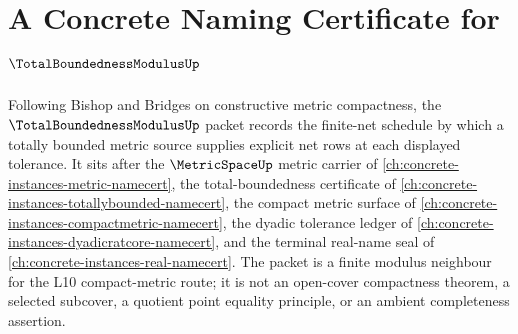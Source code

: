 \chapter{A Concrete Naming Certificate for $\TotalBoundednessModulusUp$}
\label{ch:concrete-instances-total-boundedness-modulus-namecert}

Following Bishop and Bridges on constructive metric compactness, the $\TotalBoundednessModulusUp$ packet records the finite-net schedule by which a totally bounded metric source supplies explicit net rows at each displayed tolerance. It sits after the $\MetricSpaceUp$ metric carrier of \autoref{ch:concrete-instances-metric-namecert}, the total-boundedness certificate of \autoref{ch:concrete-instances-totallybounded-namecert}, the compact metric surface of \autoref{ch:concrete-instances-compactmetric-namecert}, the dyadic tolerance ledger of \autoref{ch:concrete-instances-dyadicratcore-namecert}, and the terminal real-name seal of \autoref{ch:concrete-instances-real-namecert}. The packet is a finite modulus neighbour for the L10 compact-metric route; it is not an open-cover compactness theorem, a selected subcover, a quotient point equality principle, or an ambient completeness assertion.

